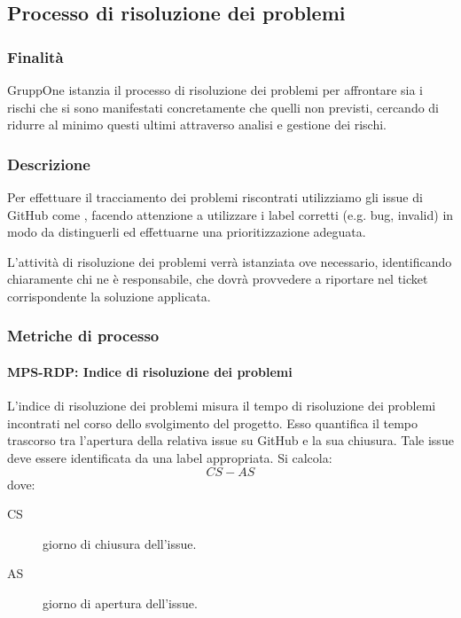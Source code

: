 \documentclass[../norme-di-progetto.tex]{subfiles}
\begin{document}


\subsection{Processo di risoluzione dei problemi}%
\label{sub:processo_di_risoluzione_dei_problemi}

\subsubsection{Finalità}%
\label{subs:processo_di_risoluzione_dei_problemi/finalita}

GruppOne istanzia il processo di risoluzione dei problemi per affrontare sia i rischi che si sono manifestati concretamente che quelli non previsti, cercando di ridurre al minimo questi ultimi attraverso analisi e gestione dei rischi.

\subsubsection{Descrizione}%
\label{subs:processo_di_risoluzione_dei_problemi/descrizione}

Per effettuare il tracciamento dei problemi riscontrati utilizziamo gli issue di GitHub come , facendo attenzione a utilizzare i label corretti (e.g\@. bug, invalid) in modo da distinguerli ed effettuarne una prioritizzazione adeguata.

L'attività di risoluzione dei problemi verrà istanziata ove necessario, identificando chiaramente chi ne è responsabile, che dovrà provvedere a riportare nel ticket corrispondente la soluzione applicata.

\subsubsection{Metriche di processo}%
\label{subs:processo_di_risoluzione_dei_problemi/metriche_di_processo}

\paragraph{MPS-RDP\@: Indice di risoluzione  dei problemi}%
\label{par:MPS-RDP_indice_di_risoluzione_dei_problemi}

L'indice di risoluzione dei problemi misura il tempo di risoluzione dei problemi incontrati nel corso dello svolgimento del progetto.
Esso quantifica il tempo trascorso tra l'apertura della relativa issue su GitHub e la sua chiusura. Tale issue deve essere identificata da una label appropriata. Si calcola:
\[
  CS-AS
\]
dove:
\begin{description}
    \item [CS] giorno di chiusura dell'issue.
    \item [AS] giorno di apertura dell'issue.
\end{description}
\end{document}
